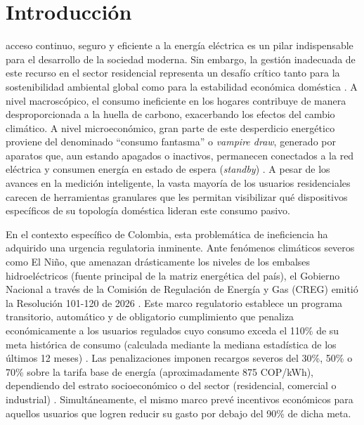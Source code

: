 \documentclass[10pt,journal,compsoc]{IEEEtran}
\begin{document}
\maketitle
\IEEEdisplaynontitleabstractindextext
\IEEEpeerreviewmaketitle

\section{Introducción}
 acceso continuo, seguro y eficiente a la energía eléctrica es un pilar indispensable para el desarrollo de la sociedad moderna. Sin embargo, la gestión inadecuada de este recurso en el sector residencial representa un desafío crítico tanto para la sostenibilidad ambiental global como para la estabilidad económica doméstica \cite{xue2025}. A nivel macroscópico, el consumo ineficiente en los hogares contribuye de manera desproporcionada a la huella de carbono, exacerbando los efectos del cambio climático. A nivel microeconómico, gran parte de este desperdicio energético proviene del denominado ``consumo fantasma'' o \emph{vampire draw}, generado por aparatos que, aun estando apagados o inactivos, permanecen conectados a la red eléctrica y consumen energía en estado de espera (\emph{standby}) \cite{dalln2016}. A pesar de los avances en la medición inteligente, la vasta mayoría de los usuarios residenciales carecen de herramientas granulares que les permitan visibilizar qué dispositivos específicos de su topología doméstica lideran este consumo pasivo.

En el contexto específico de Colombia, esta problemática de ineficiencia ha adquirido una urgencia regulatoria inminente. Ante fenómenos climáticos severos como El Niño, que amenazan drásticamente los niveles de los embalses hidroeléctricos (fuente principal de la matriz energética del país), el Gobierno Nacional a través de la Comisión de Regulación de Energía y Gas (CREG) emitió la Resolución 101-120 de 2026 \cite{creg2026}. Este marco regulatorio establece un programa transitorio, automático y de obligatorio cumplimiento que penaliza económicamente a los usuarios regulados cuyo consumo exceda el 110\% de su meta histórica de consumo (calculada mediante la mediana estadística de los últimos 12 meses) \cite{creg2026}. Las penalizaciones imponen recargos severos del 30\%, 50\% o 70\% sobre la tarifa base de energía (aproximadamente 875 COP/kWh), dependiendo del estrato socioeconómico o del sector (residencial, comercial o industrial) \cite{creg2026}. Simultáneamente, el mismo marco prevé incentivos económicos para aquellos usuarios que logren reducir su gasto por debajo del 90\% de dicha meta.
\end{document}
